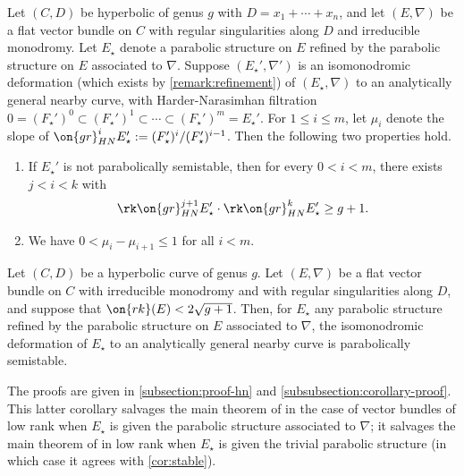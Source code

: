 \begin{theorem}
\notready
	\label{theorem:hn-constraints-parabolic}
	Let $(C,D)$ be hyperbolic of genus $g$ with $D = x_1 + \cdots + x_n$, and let
	$({E}, \nabla)$ be a flat
vector bundle on $C$ with regular singularities along $D$ and irreducible
monodromy. Let $E_\star$ denote a parabolic structure on $E$ refined by the parabolic structure on $E$ associated to $\nabla$.
Suppose
 $(E_\star',\nabla')$
 is an isomonodromic deformation (which exists by \autoref{remark:refinement})
of $({E_\star}, \nabla)$ to an analytically general nearby curve,
with Harder-Narasimhan filtration $0 = (F_\star')^0 \subset (F_\star')^1 \subset \cdots \subset
(F_\star')^m =
E_\star'$. For $1 \leq i \leq m$, let $\mu_i$ denote the slope of
$\on{gr}^{i}_{HN}E_\star' := (F'_\star)^i/(F_\star')^{i-1}$.
Then the following two properties hold.
\begin{enumerate}
	\item If $E_\star'$ is not parabolically semistable, then for every $0 < i < m$, there
	exists $j < i < k$ with $$\rk \on{gr}^{j+1}_{HN}E_\star'\cdot \rk
	\on{gr}^k_{HN}E_\star'\geq g+1.$$
\item We have $0<\mu_i-\mu_{i+1}\leq 1$ for all $i<m$.
\end{enumerate}
\end{theorem}
\begin{corollary}
\notready\label{cor:stable-parabolic}
	Let $(C, D)$ be a hyperbolic curve of genus $g$.
Let $({E}, \nabla)$ be a flat
vector bundle on $C$ with irreducible monodromy and with regular singularities
along $D$, and suppose that
$\on{rk}(E)<2\sqrt{g+1}$.
Then, for $E_\star$ any parabolic structure refined by the parabolic structure on $E$ associated to $\nabla$,
the isomonodromic deformation of $E_\star$
to an analytically general nearby curve is parabolically semistable.
\end{corollary}
The proofs are given in \autoref{subsection:proof-hn} and
\autoref{subsubsection:corollary-proof}.
This latter corollary salvages the main theorem of \cite{BHH:parabolic} in the
case of vector bundles of low rank when $E_\star$ is given the parabolic
structure associated to $\nabla$; it salvages the main theorem of
\cite{BHH:logarithmic} in low rank when $E_\star$ is given the trivial parabolic structure (in which case it agrees with \autoref{cor:stable}).

